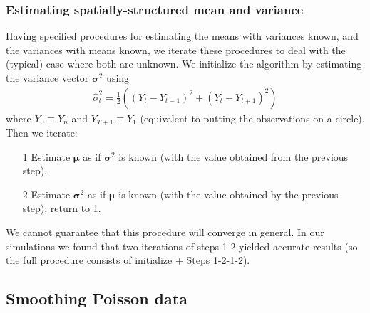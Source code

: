 \documentclass[12pt]{article}
\newcommand{\s}{\sigma}
\begin{document}

\subsubsection{Estimating spatially-structured mean and variance}

Having specified procedures for estimating the means with variances known, and the variances with means known,
we iterate these procedures to deal with the (typical) case where both are unknown.
We initialize the algorithm by estimating the variance vector $\bm{\s}^2$ using
\begin{eqnarray}\label{eq:initial var est}
\hat{\s}_t^2=\frac{1}{2}\left((Y_t-Y_{t-1})^2+(Y_t-Y_{t+1})^2\right)
\end{eqnarray}
where $Y_0\equiv Y_n$ and $Y_{T+1}\equiv Y_1$ (equivalent to putting the observations on a circle). 
Then we iterate:
\begin{enumerate}
\item[1] Estimate $\bm{\mu}$ as if $\bm{\s}^2$ is known (with the value obtained from the previous step).
\item[2] Estimate $\bm{\s}^2$ as if ${\bm{\mu}}$ is known (with the value obtained by the previous step); return to 1.
\end{enumerate}
We cannot guarantee that this procedure will converge in general. In our simulations we found
that two iterations of steps 1-2 yielded accurate results (so the full procedure consists of initialize + Steps 1-2-1-2).

 \subsection{Smoothing Poisson data}

\def\Poi{\text{Poi}}
\def\Bin{\text{Bin}}
\end{document}
